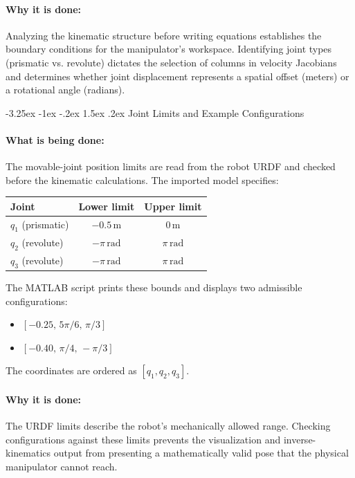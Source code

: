 \documentclass[11pt, a4paper]{article}
\makeatletter
\renewcommand{\subsection}{\@startsection{subsection}{2}{\z@}%
    {-3.25ex \@plus -1ex \@minus -.2ex}%
    {1.5ex \@plus .2ex}%
    {\normalfont\large\bfseries\color{brandaccent}}}
\makeatother
\begin{document}
\paragraph{Why it is done:}
Analyzing the kinematic structure before writing equations establishes the boundary conditions for the manipulator's workspace. Identifying joint types (prismatic vs. revolute) dictates the selection of columns in velocity Jacobians and determines whether joint displacement represents a spatial offset (meters) or a rotational angle (radians).

\subsection{Joint Limits and Example Configurations}
\paragraph{What is being done:}
The movable-joint position limits are read from the robot URDF and checked before the kinematic calculations. The imported model specifies:
\begin{center}
\begin{tabular}{lcc}
\toprule
\textbf{Joint} & \textbf{Lower limit} & \textbf{Upper limit} \\
\midrule
$q_1$ (prismatic) & $-0.5\,\mathrm{m}$ & $0\,\mathrm{m}$ \\
$q_2$ (revolute) & $-\pi\,\mathrm{rad}$ & $\pi\,\mathrm{rad}$ \\
$q_3$ (revolute) & $-\pi\,\mathrm{rad}$ & $\pi\,\mathrm{rad}$ \\
\bottomrule
\end{tabular}
\end{center}
The MATLAB script prints these bounds and displays two admissible configurations:
\begin{itemize}[leftmargin=1.5em]
    \item $[-0.25,\,5\pi/6,\,\pi/3]$
    \item $[-0.40,\,\pi/4,\,-\pi/3]$
\end{itemize}
The coordinates are ordered as $[q_1,q_2,q_3]$.

\paragraph{Why it is done:}
The URDF limits describe the robot's mechanically allowed range. Checking configurations against these limits prevents the visualization and inverse-kinematics output from presenting a mathematically valid pose that the physical manipulator cannot reach.
\end{document}
